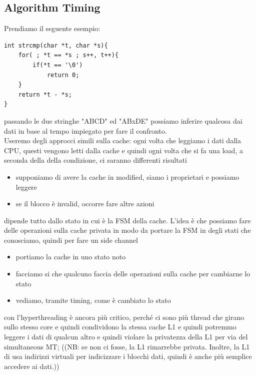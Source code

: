 \documentclass[12pt, oneside]{extbook} %
\begin{document}
\subsection{Algorithm Timing}
Prendiamo il seguente esempio:
\begin{lstlisting}
int strcmp(char *t, char *s){
	for( ; *t == *s ; s++, t++){
		if(*t == '\0')
			return 0;	
	}
	return *t - *s;
}
\end{lstlisting}
passando le due stringhe "ABCD" ed "ABxDE" possiamo inferire qualcosa dai dati in base al tempo impiegato per fare il confronto.\\ Useremo degli approcci simili sulla cache: ogni volta che leggiamo i dati dalla CPU, questi vengono letti dalla cache e quindi ogni volta che si fa una load, a seconda della della condizione, ci saranno differenti risultati
\begin{itemize}
\item supponiamo di avere la cache in modified, siamo i proprietari e possiamo leggere
\item se il blocco è invalid, occorre fare altre azioni
\end{itemize}
dipende tutto dallo stato in cui è la FSM della cache. L'idea è che possiamo fare delle operazioni sulla cache privata in modo da portare la FSM in degli stati che conosciamo, quindi per fare un side channel
\begin{itemize}
\item portiamo la cache in uno stato noto
\item facciamo si che qualcuno faccia delle operazioni sulla cache per cambiarne lo stato
\item vediamo, tramite timing, come è cambiato lo stato
\end{itemize}
con l'hyperthreading è ancora più critico, perché ci sono più thread che girano sullo stesso core e quindi condividono la stessa cache L1 e quindi potremmo leggere i dati di qualcun altro e quindi violare la privatezza della L1 per via del simultaneous MT; ((NB: se non ci fosse, la L1 rimarrebbe privata. Inoltre, la L1 di usa indirizzi virtuali per indicizzare i blocchi dati, quindi è anche più semplice accedere ai dati.))
\end{document}

